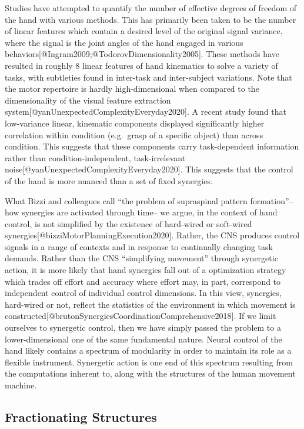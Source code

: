 \documentclass[../main.tex]{subfiles}
\begin{document}
Studies have attempted to quantify the number of effective degrees of freedom of the hand with various methods. This has primarily been taken to be the number of linear features which contain a desired level of the original signal variance, where the signal is the joint angles of the hand engaged in various behaviors{[}@Ingram2009;@TodorovDimensionality2005{]}. These methods have resulted in roughly 8 linear features of hand kinematics to solve a variety of tasks, with subtleties found in inter-task and inter-subject variations. Note that the motor repertoire is hardly high-dimensional when compared to the dimensionality of the visual feature extraction system{[}@yanUnexpectedComplexityEveryday2020{]}. A recent study found that low-variance linear, kinematic components displayed significantly higher correlation within condition (e.g.~grasp of a specific object) than across condition. This suggests that these components carry task-dependent information rather than condition-independent, task-irrelevant noise{[}@yanUnexpectedComplexityEveryday2020{]}. This suggests that the control of the hand is more nuanced than a set of fixed synergies.

What Bizzi and colleagues call ``the problem of supraspinal pattern formation''--how synergies are activated through time-- we argue, in the context of hand control, is not simplified by the existence of hard-wired or soft-wired synergies{[}@bizziMotorPlanningExecution2020{]}. Rather, the CNS produces control signals in a range of contexts and in response to continually changing task demands. Rather than the CNS ``simplifying movement'' through synergetic action, it is more likely that hand synergies fall out of a optimization strategy which trades off effort and accuracy where effort may, in part, correspond to independent control of individual control dimensions. In this view, synergies, hard-wired or not, reflect the statistics of the environment in which movement is constructed{[}@brutonSynergiesCoordinationComprehensive2018{]}. If we limit ourselves to synergetic control, then we have simply passed the problem to a lower-dimensional one of the same fundamental nature. Neural control of the hand likely contains a spectrum of modularity in order to maintain its role as a flexible instrument. Synergetic action is one end of this spectrum resulting from the computations inherent to, along with the structures of the human movement machine.

\subsection{Fractionating Structures}\label{fractionating-structures}
\end{document}
